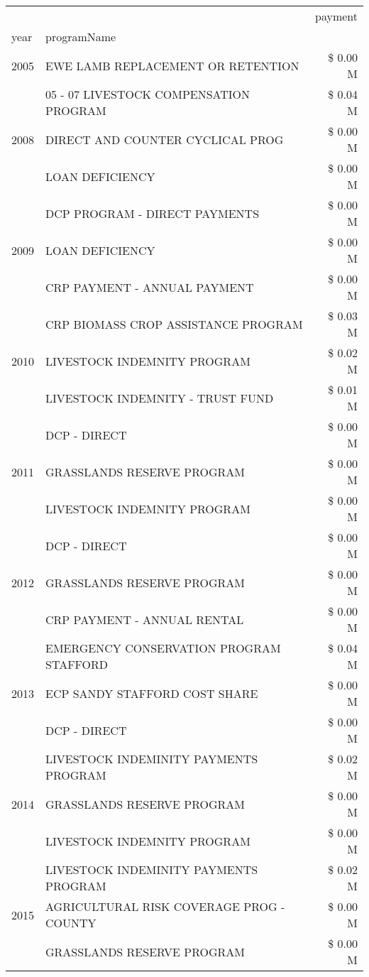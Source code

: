 \begin{tabular}{llr}
\toprule
 &  & payment \\
year & programName &  \\
\midrule
2005 & EWE LAMB REPLACEMENT OR RETENTION & \$ 0.00 M \\
\cline{1-3}
\multirow[t]{3}{*}{2008} & 05 - 07 LIVESTOCK COMPENSATION PROGRAM & \$ 0.04 M \\
 & DIRECT AND COUNTER CYCLICAL PROG & \$ 0.00 M \\
 & LOAN DEFICIENCY & \$ 0.00 M \\
\cline{1-3}
\multirow[t]{3}{*}{2009} & DCP PROGRAM - DIRECT PAYMENTS & \$ 0.00 M \\
 & LOAN DEFICIENCY & \$ 0.00 M \\
 & CRP PAYMENT - ANNUAL PAYMENT & \$ 0.00 M \\
\cline{1-3}
\multirow[t]{3}{*}{2010} & CRP BIOMASS CROP ASSISTANCE PROGRAM & \$ 0.03 M \\
 & LIVESTOCK INDEMNITY PROGRAM & \$ 0.02 M \\
 & LIVESTOCK INDEMNITY - TRUST FUND & \$ 0.01 M \\
\cline{1-3}
\multirow[t]{3}{*}{2011} & DCP - DIRECT & \$ 0.00 M \\
 & GRASSLANDS RESERVE PROGRAM & \$ 0.00 M \\
 & LIVESTOCK INDEMNITY PROGRAM & \$ 0.00 M \\
\cline{1-3}
\multirow[t]{3}{*}{2012} & DCP - DIRECT & \$ 0.00 M \\
 & GRASSLANDS RESERVE PROGRAM & \$ 0.00 M \\
 & CRP PAYMENT - ANNUAL RENTAL & \$ 0.00 M \\
\cline{1-3}
\multirow[t]{3}{*}{2013} & EMERGENCY CONSERVATION PROGRAM STAFFORD & \$ 0.04 M \\
 & ECP SANDY STAFFORD COST SHARE & \$ 0.00 M \\
 & DCP - DIRECT & \$ 0.00 M \\
\cline{1-3}
\multirow[t]{3}{*}{2014} & LIVESTOCK INDEMINITY PAYMENTS PROGRAM & \$ 0.02 M \\
 & GRASSLANDS RESERVE PROGRAM & \$ 0.00 M \\
 & LIVESTOCK INDEMNITY PROGRAM & \$ 0.00 M \\
\cline{1-3}
\multirow[t]{3}{*}{2015} & LIVESTOCK INDEMINITY PAYMENTS PROGRAM & \$ 0.02 M \\
 & AGRICULTURAL RISK COVERAGE PROG - COUNTY & \$ 0.00 M \\
 & GRASSLANDS RESERVE PROGRAM & \$ 0.00 M \\

\end{tabular}
